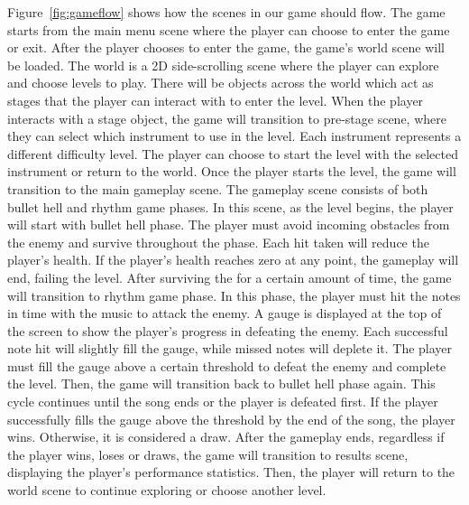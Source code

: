 \noindent Figure~\ref{fig:gameflow} shows how the scenes in our game should flow.
The game starts from the main menu scene where the player can choose to enter the game or exit.
After the player chooses to enter the game, the game's world scene will be loaded.
The world is a 2D side-scrolling scene where the player can explore and choose levels to play.
There will be objects across the world which act as stages that the player can interact with to 
enter the level.
When the player interacts with a stage object, the game will transition to pre-stage scene, where 
they can select which instrument to use in the level.
Each instrument represents a different difficulty level.
The player can choose to start the level with the selected instrument or return to the world.
Once the player starts the level, the game will transition to the main gameplay scene.
The gameplay scene consists of both bullet hell and rhythm game phases.
In this scene, as the level begins, the player will start with bullet hell phase.
The player must avoid incoming obstacles from the enemy and survive throughout the phase.
Each hit taken will reduce the player's health.
If the player's health reaches zero at any point, the gameplay will end, failing the level.
After surviving the for a certain amount of time, the game will transition to rhythm game phase.
In this phase, the player must hit the notes in time with the music to attack the enemy.
A gauge is displayed at the top of the screen to show the player's progress in defeating the enemy.
Each successful note hit will slightly fill the gauge, while missed notes will deplete it.
The player must fill the gauge above a certain threshold to defeat the enemy and complete the level.
Then, the game will transition back to bullet hell phase again.
This cycle continues until the song ends or the player is defeated first.
If the player successfully fills the gauge above the threshold by the end of the song, the player wins.
Otherwise, it is considered a draw.
After the gameplay ends, regardless if the player wins, loses or draws, the game will transition to results 
scene, displaying the player's performance statistics.
Then, the player will return to the world scene to continue exploring or choose another level.
